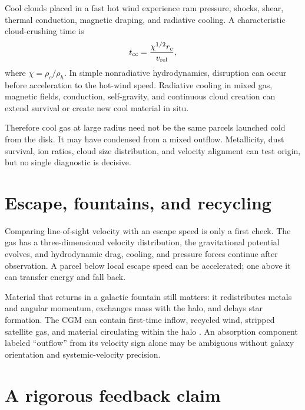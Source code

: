Cool clouds placed in a fast hot wind experience ram pressure, shocks, shear, thermal
conduction, magnetic draping, and radiative cooling.  A characteristic cloud-crushing
time is
\begin{equation}
 t_{\rm cc}=\frac{\chi^{1/2}r_c}{v_{\rm rel}},
 \label{eq:cloud-crushing-time}
\end{equation}
where $\chi=\rho_c/\rho_h$.  In simple nonradiative hydrodynamics, disruption can occur
before acceleration to the hot-wind speed.  Radiative cooling in mixed gas, magnetic
fields, conduction, self-gravity, and continuous cloud creation can extend survival
or create new cool material in situ.

Therefore cool gas at large radius need not be the same parcels launched cold from
the disk.  It may have condensed from a mixed outflow.  Metallicity, dust survival,
ion ratios, cloud size distribution, and velocity alignment can test origin, but no
single diagnostic is decisive.

\section{Escape, fountains, and recycling}

Comparing line-of-sight velocity with an escape speed is only a first check.  The gas
has a three-dimensional velocity distribution, the gravitational potential evolves,
and hydrodynamic drag, cooling, and pressure forces continue after observation.  A
parcel below local escape speed can be accelerated; one above it can transfer energy
and fall back.

Material that returns in a galactic fountain still matters: it redistributes metals
and angular momentum, exchanges mass with the halo, and delays star formation.  The
CGM can contain first-time inflow, recycled wind, stripped satellite gas, and material
circulating within the halo \citep{TumlinsonPeeplesWerk2017}.  An absorption component
labeled ``outflow'' from its velocity sign alone may be ambiguous without galaxy
orientation and systemic-velocity precision.

\section{A rigorous feedback claim}

